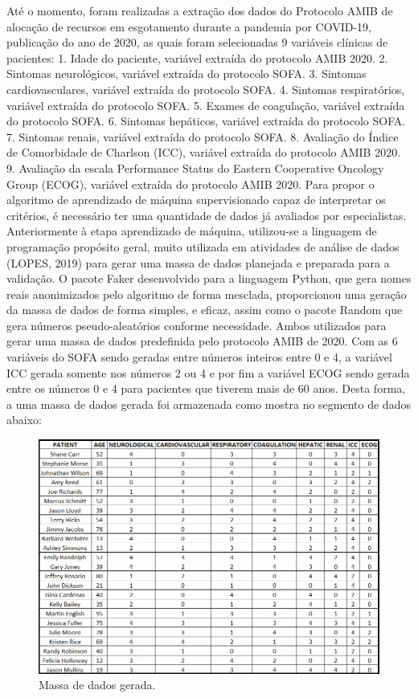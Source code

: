\documentclass[12pt]{article}
\begin{document}
Até o momento, foram realizadas a extração dos dados do Protocolo AMIB de alocação de recursos em esgotamento durante a pandemia por COVID-19, publicação do ano de 2020, as quais foram selecionadas 9 variáveis clínicas de pacientes:
1.	Idade do paciente, variável extraída do protocolo AMIB 2020.
2.	Sintomas neurológicos, variável extraída do protocolo SOFA.
3.	Sintomas cardiovasculares, variável extraída do protocolo SOFA.
4.	Sintomas respiratórios, variável extraída do protocolo SOFA.
5.	Exames de coagulação, variável extraída do protocolo SOFA.
6.	Sintomas hepáticos, variável extraída do protocolo SOFA.
7.	Sintomas renais, variável extraída do protocolo SOFA.
8.	Avaliação do Índice de Comorbidade de Charlson (ICC), variável extraída do protocolo AMIB 2020.
9.	Avaliação da escala Performance Status do Eastern Cooperative Oncology Group (ECOG), variável extraída do protocolo AMIB 2020.
Para propor o algoritmo de aprendizado de máquina supervisionado capaz de interpretar os critérios, é necessário ter uma quantidade de dados já avaliados por especialistas. Anteriormente à etapa aprendizado de máquina, utilizou-se a linguagem de programação propósito geral, muito utilizada em atividades de análise de dados (LOPES, 2019) para gerar uma massa de dados planejada e preparada para a validação.
O pacote Faker desenvolvido para a linguagem Python, que gera nomes reais anonimizados pelo algoritmo de forma mesclada, proporcionou uma geração da massa de dados de forma simples, e eficaz, assim como o pacote Random que gera números pseudo-aleatórios conforme necessidade. Ambos utilizados para gerar uma massa de dados predefinida pelo protocolo AMIB de 2020.
Com as 6 variáveis do SOFA sendo geradas entre números inteiros entre 0 e 4, a variável ICC gerada somente nos números 2 ou 4 e por fim a variável ECOG sendo gerada entre os números 0 e 4 para pacientes que tiverem mais de 60 anos. Desta forma, a uma massa de dados gerada foi armazenada como mostra no segmento de dados abaixo:

\begin{figure}[!htb]
    \centering
    \includegraphics[scale=0.6]{img/massa de dados gerada.png}
    \centering
    \caption{Massa de dados gerada.}
\end{figure}
\end{document}
